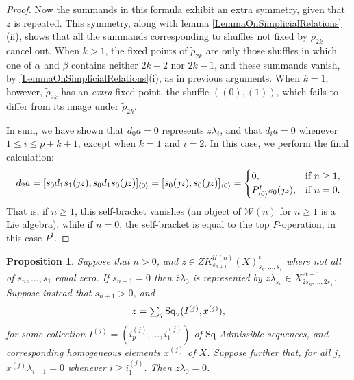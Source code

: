 \documentclass[11pt]{amsart}
\theoremstyle{plain}
\newtheorem{prop}[thm]{Proposition}
\theoremstyle{definition}
\newcommand{\calW}{\mathcal{W}}
\newcommand{\calU}{\mathcal{U}}
\theoremstyle{plain}
\newcommand{\Sq}{\mathrm{Sq}}
\begin{document}
\begin{Koszul complexes}
\begin{proof}
Now the summands in this formula exhibit an extra symmetry, given that $z$ is repeated. This symmetry, along with lemma \ref{LemmaOnSimplicialRelations}(ii), shows that all the summands corresponding to shuffles not fixed by $\widetilde{\rho}_{2k}$ cancel out. When $k>1$, the fixed points of $\widetilde{\rho}_{2k}$ are only those shuffles in which one of $\alpha$ and $\beta$ contains neither $2k-2$ nor $2k-1$, and these summands vanish, by \ref{LemmaOnSimplicialRelations}(i), as in previous arguments. When $k=1$, however, $\widetilde{\rho}_{2k}$ has an \emph{extra} fixed point, the shuffle $((0),(1))$, which fails to differ from its image under $\widetilde{\rho}_{2k}$.

In sum, we have shown that $d_0a=0$ represents $\overline{z}\lambda_i$, and that $d_ia=0$ whenever $1\leq i\leq p+k+1$, except when $k=1$ and $i=2$. In this case, we perform the final calculation:
\[d_2a=[s_{0}d_1s_1(\jmath z), s_{0}d_1s_0(\jmath z)]_{\langle 0\rangle}=[s_{0}(\jmath z), s_{0}(\jmath z)]_{\langle 0\rangle}=\begin{cases}
0,&\textup{if }n\geq1,\\
P^{t}_{\langle 0\rangle}s_0(\jmath z),&\textup{if }n=0.
\end{cases}\]
That is, if $n\geq1$, this self-bracket vanishes (an object of $\calW(n)$ for $n\geq1$ is a Lie algebra), while if $n=0$, the self-bracket is equal to the top $P$-operation, in this case $P^t$. %
\end{proof}
\begin{prop}\label{Q0ZeroByPriddyAlg}
Suppose that $n>0$, and $z\in ZK^{\calU(n)}_{s_{n+1}}(X)_{s_n,\ldots,s_1}^t$ where not all of $s_n,\ldots,s_1$ equal zero. If $s_{n+1}=0$ then $\overline{z}\lambda_0$ is represented by $z\lambda_{s_n}\in X_{2s_n,\ldots,2s_1}^{2t+1}$. Suppose instead that $s_{n+1}>0$, and 
\[z=\textstyle\sum_{j}\Sq_\textup{v}(I^{(j)},x^{(j)}),\]
for some collection $I^{(j)}=(i^{(j)}_{p},\ldots,i^{(j)}_{1})$ of  $\Sq$-Admissible sequences, and corresponding homogeneous elements $x^{(j)}$ of $X$. Suppose further that, for all $j$, $x^{(j)}\lambda_{i-1}=0$ whenever $i\geq i^{{(j)}}_1$. Then $\overline{z}\lambda_0=0$.
\end{prop}

\end{Koszul complexes}
\end{document}
